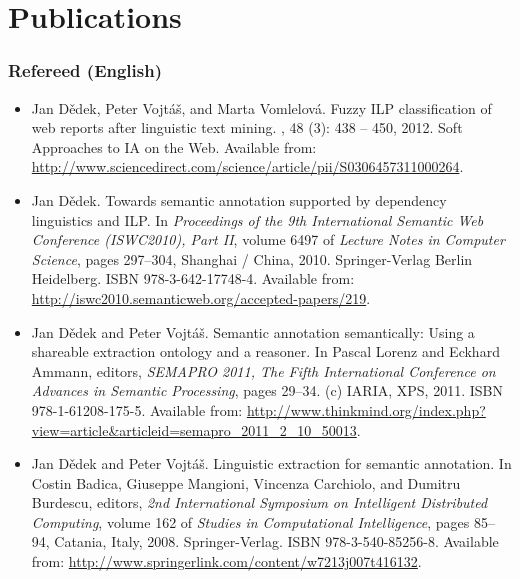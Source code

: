 \documentclass[12pt,a4paper,twoside,notitlepage]{article}
\begin{document}
\newpage

\section*{Publications} \label{sec:my_publications}

\subsubsection*{Refereed (English)}

\begin{itemize}


\item
Jan D{\v{e}}dek, Peter Vojt{\'{a}}{\v{s}}, and Marta Vomlelov{\'{a}}.
\newblock Fuzzy {ILP} classification of web reports after linguistic text
  mining.
, 48 (3):
  438 -- 450, 2012.
\newblock Soft Approaches to IA on the Web.
\newblock Available from:
  \url{http://www.sciencedirect.com/science/article/pii/S0306457311000264}.


\item
Jan D{\v{e}}dek.
\newblock Towards semantic annotation supported by dependency linguistics and
  {ILP}.
\newblock In {\em Proceedings of the 9th International Semantic Web Conference
  (ISWC2010), Part II}, volume 6497 of {\em Lecture Notes in Computer Science},
  pages 297--304, Shanghai / China, 2010. Springer-Verlag Berlin Heidelberg.
\newblock ISBN 978-3-642-17748-4.
\newblock Available from:
  \url{http://iswc2010.semanticweb.org/accepted-papers/219}.

\item
Jan D{\v{e}}dek and Peter Vojt{\'{a}}{\v{s}}.
\newblock Semantic annotation semantically: Using a shareable extraction
  ontology and a reasoner.
\newblock In Pascal Lorenz and Eckhard Ammann, editors, {\em {SEMAPRO 2011},
  The Fifth International Conference on Advances in Semantic Processing}, pages
  29--34. (c) {IARIA}, {XPS}, 2011.
\newblock ISBN 978-1-61208-175-5.
\newblock Available from:
  \url{http://www.thinkmind.org/index.php?view=article&articleid=semapro_2011_2_10_50013}.



\item
Jan D{\v{e}}dek and Peter Vojt{\'{a}}{\v{s}}.
\newblock Linguistic extraction for semantic annotation.
\newblock In Costin Badica, Giuseppe Mangioni, Vincenza Carchiolo, and Dumitru
  Burdescu, editors, {\em 2nd International Symposium on Intelligent
  Distributed Computing}, volume 162 of {\em Studies in Computational
  Intelligence}, pages 85--94, Catania, Italy, 2008. Springer-Verlag.
\newblock ISBN 978-3-540-85256-8.
\newblock Available from:
  \url{http://www.springerlink.com/content/w7213j007t416132}.



\end{itemize}
\end{document}

